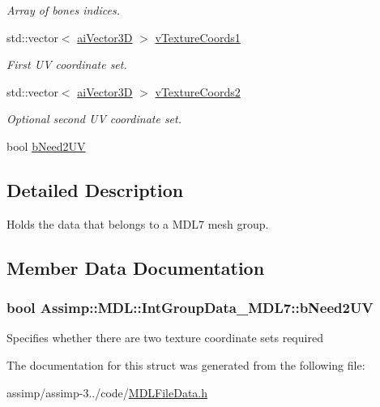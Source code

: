 \begin{DoxyCompactItemize}
\begin{DoxyCompactList}\small\item\em Array of bones indices. \end{DoxyCompactList}\item 
\hypertarget{struct_assimp_1_1_m_d_l_1_1_int_group_data___m_d_l7_a54af113b7fc21fc654fa91b2aa3da98e}{std\+::vector$<$ \hyperlink{structai_vector3_d}{ai\+Vector3\+D} $>$ \hyperlink{struct_assimp_1_1_m_d_l_1_1_int_group_data___m_d_l7_a54af113b7fc21fc654fa91b2aa3da98e}{v\+Texture\+Coords1}}\label{struct_assimp_1_1_m_d_l_1_1_int_group_data___m_d_l7_a54af113b7fc21fc654fa91b2aa3da98e}

\begin{DoxyCompactList}\small\item\em First U\+V coordinate set. \end{DoxyCompactList}\item 
\hypertarget{struct_assimp_1_1_m_d_l_1_1_int_group_data___m_d_l7_a19cc0d3b580d8fe8371c738d8807c8da}{std\+::vector$<$ \hyperlink{structai_vector3_d}{ai\+Vector3\+D} $>$ \hyperlink{struct_assimp_1_1_m_d_l_1_1_int_group_data___m_d_l7_a19cc0d3b580d8fe8371c738d8807c8da}{v\+Texture\+Coords2}}\label{struct_assimp_1_1_m_d_l_1_1_int_group_data___m_d_l7_a19cc0d3b580d8fe8371c738d8807c8da}

\begin{DoxyCompactList}\small\item\em Optional second U\+V coordinate set. \end{DoxyCompactList}\item 
bool \hyperlink{struct_assimp_1_1_m_d_l_1_1_int_group_data___m_d_l7_a039a9fe0b7380c6e02c47fb83ba2648e}{b\+Need2\+U\+V}
\end{DoxyCompactItemize}


\subsection{Detailed Description}
Holds the data that belongs to a M\+D\+L7 mesh group. 

\subsection{Member Data Documentation}
\hypertarget{struct_assimp_1_1_m_d_l_1_1_int_group_data___m_d_l7_a039a9fe0b7380c6e02c47fb83ba2648e}{
\subsubsection[{b\+Need2\+U\+V}]{\setlength{\rightskip}{0pt plus 5cm}bool Assimp\+::\+M\+D\+L\+::\+Int\+Group\+Data\+\_\+\+M\+D\+L7\+::b\+Need2\+U\+V}}\label{struct_assimp_1_1_m_d_l_1_1_int_group_data___m_d_l7_a039a9fe0b7380c6e02c47fb83ba2648e}
Specifies whether there are two texture coordinate sets required 

The documentation for this struct was generated from the following file\+:\begin{DoxyCompactItemize}
\item 
assimp/assimp-\/3../code/\hyperlink{_m_d_l_file_data_8h}{M\+D\+L\+File\+Data.\+h}\end{DoxyCompactItemize}
